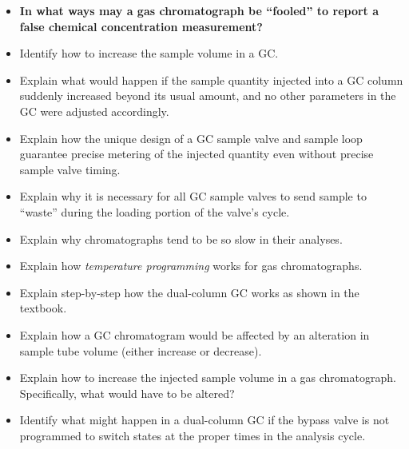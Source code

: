\begin{itemize}
\item{} {\bf In what ways may a gas chromatograph be ``fooled'' to report a false chemical concentration measurement?}
\item{} Identify how to increase the sample volume in a GC.
\item{} Explain what would happen if the sample quantity injected into a GC column suddenly increased beyond its usual amount, and no other parameters in the GC were adjusted accordingly.
\item{} Explain how the unique design of a GC sample valve and sample loop guarantee precise metering of the injected quantity even without precise sample valve timing.
\item{} Explain why it is necessary for all GC sample valves to send sample to ``waste'' during the loading portion of the valve's cycle.
\item{} Explain why chromatographs tend to be so slow in their analyses.
\item{} Explain how {\it temperature programming} works for gas chromatographs.
\item{} Explain step-by-step how the dual-column GC works as shown in the textbook.
\item{} Explain how a GC chromatogram would be affected by an alteration in sample tube volume (either increase or decrease).
\item{} Explain how to increase the injected sample volume in a gas chromatograph.  Specifically, what would have to be altered?
\item{} Identify what might happen in a dual-column GC if the bypass valve is not programmed to switch states at the proper times in the analysis cycle.
\end{itemize}




